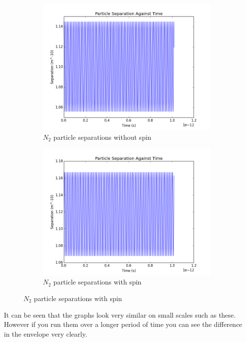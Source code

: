 \documentclass[12pt]{article}
\begin{document}
	\begin{figure}[H]
		\centering
		\begin{subfigure}{0.45\textwidth}
			\includegraphics[width=\textwidth]{n2nospinsep}
			\caption*{$N_2$ particle separations without spin}
		\end{subfigure}
		\begin{subfigure}{0.45\textwidth}
			\includegraphics[width=\textwidth]{n2spinsep}
			\caption*{$N_2$ particle separations with spin}
		\end{subfigure}
	\end{figure}
	
It can be seen that the graphs look very similar on small scales such as these. However if you run them over a longer period of time you can see the difference in the envelope very clearly. 
\end{document}
